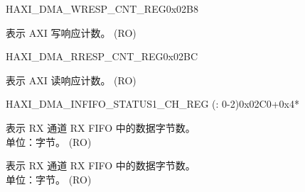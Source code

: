 \begin{register}{H}{AXI\_DMA\_WRESP\_CNT\_REG}{0x02B8}\label{regdesc:AXIDMAWRESPCNTREG}
%
%
\regnewline%
\begin{regdesc}\begin{reglist}
\label{fielddesc:AXIDMAWRESPCNT}\item [AXI\_DMA\_WRESP\_CNT] 表示 AXI 写响应计数。 (RO)
\end{reglist}\end{regdesc}
\end{register}


\begin{register}{H}{AXI\_DMA\_RRESP\_CNT\_REG}{0x02BC}\label{regdesc:AXIDMARRESPCNTREG}
%
%
\regnewline%
\begin{regdesc}\begin{reglist}
\label{fielddesc:AXIDMARRESPCNT}\item [AXI\_DMA\_RRESP\_CNT] 表示 AXI 读响应计数。 (RO)
\end{reglist}\end{regdesc}
\end{register}


\begin{register}{H}{AXI\_DMA\_INFIFO\_STATUS1\_CH\_REG (: 0-2)}{0x02C0+0x4*}\label{regdesc:AXIDMAINFIFOSTATUS1CHNREG}
%
%
%
\regnewline%
\begin{regdesc}\begin{reglist}
\label{fielddesc:AXIDMAL1INFIFOCNTCHN}\item [AXI\_DMA\_L1INFIFO\_CNT\_CH\regindex{n}] 表示 RX 通道  RX FIFO 中的数据字节数。\\单位：字节。 (RO)
\label{fielddesc:AXIDMAL2INFIFOCNTCHN}\item [AXI\_DMA\_L2INFIFO\_CNT\_CH\regindex{n}] 表示 RX 通道  RX FIFO 中的数据字节数。\\单位：字节。 (RO)
\end{reglist}\end{regdesc}
\end{register}


